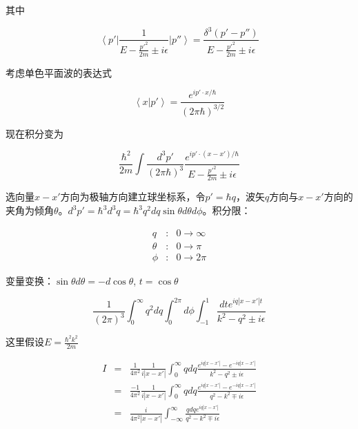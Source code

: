 其中

\begin{equation}
\left\langle p' \right| \frac{1}{E - \frac{p'^2 }{2m } \pm i \epsilon} \left| p'' \right\rangle = \frac{ \delta^3 (p' - p'')  }{E - \frac{p'^2 }{2m } \pm i \epsilon}
\end{equation}

考虑单色平面波的表达式

\begin{equation}
\left\langle x | p' \right\rangle = \frac{e^{i p' \cdot x / \hbar }}{ (2 \pi \hbar)^{3/2}}
\end{equation}

现在积分变为

\begin{equation}
\frac{\hbar^2}{2m } \int \frac{d^3 p'}{( 2 \pi \hbar)^3} \frac{e^{i p' \cdot (x- x') / \hbar}}{E - \frac{p'^2 }{2m } \pm i \epsilon}
\end{equation}

选向量$x - x'$方向为极轴方向建立球坐标系，令$p' = \hbar q$，波矢$q$方向与$x - x'$方向的夹角为倾角$\theta$。$d^3 p' = \hbar^3 d^3 q = \hbar^3 q^2 dq \sin \theta d \theta d \phi $。积分限：

\begin{eqnarray*}
q & : & 0 \to \infty \\
\theta & : & 0 \to \pi \\
\phi & : & 0 \to 2 \pi
\end{eqnarray*}

变量变换：$\sin \theta d \theta = - d \cos \theta$, $ t = \cos \theta$

\begin{equation}
\frac{1}{(2 \pi)^3} \int_0^{\infty} q^2 dq \int_0^{2 \pi} d \phi \int_{-1}^1 \frac{d t  e^{i q |x - x'| t}}{k^2 - q^2 \pm i \epsilon} 
\end{equation}

这里假设$E = \frac{\hbar^2 k^2}{ 2m }$

\begin{eqnarray*}
I & = & \frac{1}{4 \pi^2}  \frac{1}{i | x-x' |} \int_0^{\infty} q dq \frac{ e^{i q |x-x'|} - e^{ - i q |x-x'|} }{k^2 - q^2 \pm i \epsilon }  \\
{} & = &  \frac{-1}{4 \pi^2} \frac{1}{i | x-x' |} \int_0^{\infty} q dq \frac{ e^{i q |x-x'|  }  - e^{-i q |x-x'|} }{ q^2 - k^2  \mp i \epsilon }  \\
{} & = & \frac{i}{4 \pi^2 | x-x' | }  \int_{- \infty}^{\infty} \frac{q dq e^{i q |x - x'|}}{ q^2 - k^2 \mp i \epsilon }
\end{eqnarray*}

